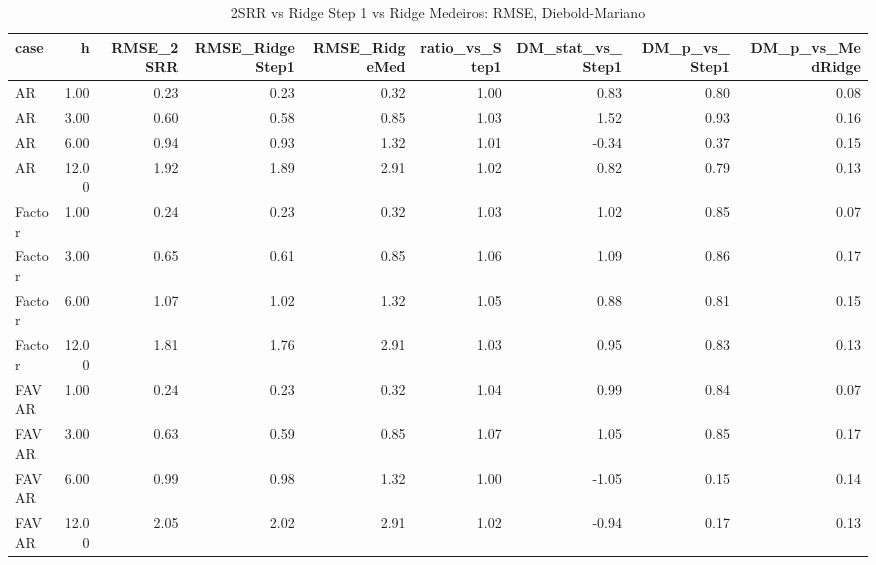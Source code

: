 \begin{table}[ht]
\centering
\begin{tabular}{lrrrrrrrr}
  \hline
case & h & RMSE\_2SRR & RMSE\_RidgeStep1 & RMSE\_RidgeMed & ratio\_vs\_Step1 & DM\_stat\_vs\_Step1 & DM\_p\_vs\_Step1 & DM\_p\_vs\_MedRidge \\ 
  \hline
AR & 1.00 & 0.23 & 0.23 & 0.32 & 1.00 & 0.83 & 0.80 & 0.08 \\ 
  AR & 3.00 & 0.60 & 0.58 & 0.85 & 1.03 & 1.52 & 0.93 & 0.16 \\ 
  AR & 6.00 & 0.94 & 0.93 & 1.32 & 1.01 & -0.34 & 0.37 & 0.15 \\ 
  AR & 12.00 & 1.92 & 1.89 & 2.91 & 1.02 & 0.82 & 0.79 & 0.13 \\ 
  Factor & 1.00 & 0.24 & 0.23 & 0.32 & 1.03 & 1.02 & 0.85 & 0.07 \\ 
  Factor & 3.00 & 0.65 & 0.61 & 0.85 & 1.06 & 1.09 & 0.86 & 0.17 \\ 
  Factor & 6.00 & 1.07 & 1.02 & 1.32 & 1.05 & 0.88 & 0.81 & 0.15 \\ 
  Factor & 12.00 & 1.81 & 1.76 & 2.91 & 1.03 & 0.95 & 0.83 & 0.13 \\ 
  FAVAR & 1.00 & 0.24 & 0.23 & 0.32 & 1.04 & 0.99 & 0.84 & 0.07 \\ 
  FAVAR & 3.00 & 0.63 & 0.59 & 0.85 & 1.07 & 1.05 & 0.85 & 0.17 \\ 
  FAVAR & 6.00 & 0.99 & 0.98 & 1.32 & 1.00 & -1.05 & 0.15 & 0.14 \\ 
  FAVAR & 12.00 & 2.05 & 2.02 & 2.91 & 1.02 & -0.94 & 0.17 & 0.13 \\ 
   \hline
\end{tabular}
\caption{2SRR vs Ridge Step 1 vs Ridge Medeiros: RMSE, Diebold-Mariano} 
\label{tab:2srr_vs_ridge}
\end{table}
